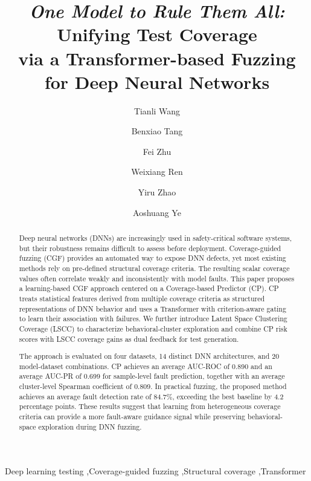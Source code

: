 \documentclass[preprint,number,5p,twocolumn]{elsarticle}
\begin{document}
\begin{frontmatter}

\title{\textbf{\textit{One Model to Rule Them All:}} Unifying Test Coverage\\
 via a Transformer-based Fuzzing for Deep Neural Networks}

\author[label1]{Tianli Wang}
\author[label1]{Benxiao Tang}
\author[label1]{Fei Zhu}
\author[label2]{Weixiang Ren}
\author[label3]{Yiru Zhao}
\author[label1]{Aoshuang Ye}

\address[label1]{School of Computer Science and Artificial Intelligence, Wuhan Textile University, Wuhan, 430200, China}
\address[label2]{School of Computer Science, Zhengzhou University of Aeronautics, Zhengzhou, 450046, China}
\address[label3]{School of Cyber Science and Engineering, Wuhan University, Wuhan, 430072, China}


\begin{abstract}
Deep neural networks (DNNs) are increasingly used in safety-critical software systems, but their robustness remains difficult to assess before deployment. Coverage-guided fuzzing (CGF) provides an automated way to expose DNN defects, yet most existing methods rely on pre-defined structural coverage criteria. The resulting scalar coverage values often correlate weakly and inconsistently with model faults. This paper proposes a learning-based CGF approach centered on a Coverage-based Predictor (CP). CP treats statistical features derived from multiple coverage criteria as structured representations of DNN behavior and uses a Transformer with criterion-aware gating to learn their association with failures. We further introduce Latent Space Clustering Coverage (LSCC) to characterize behavioral-cluster exploration and combine CP risk scores with LSCC coverage gains as dual feedback for test generation. 

The approach is evaluated on four datasets, 14 distinct DNN architectures, and 20 model-dataset combinations. CP achieves an average AUC-ROC of 0.890 and an average AUC-PR of 0.699 for sample-level fault prediction, together with an average cluster-level Spearman coefficient of 0.809. In practical fuzzing, the proposed method achieves an average fault detection rate of 84.7\%, exceeding the best baseline by 4.2 percentage points. These results suggest that learning from heterogeneous coverage criteria can provide a more fault-aware guidance signal while preserving behavioral-space exploration during DNN fuzzing.
\end{abstract}

\begin{keyword}
Deep learning testing \sep Coverage-guided fuzzing \sep Structural coverage \sep Transformer
\end{keyword}
\end{frontmatter}
\makeatletter
\let\@makecol\@LN@makecol
\makeatother
\linenumbers
\end{document}
